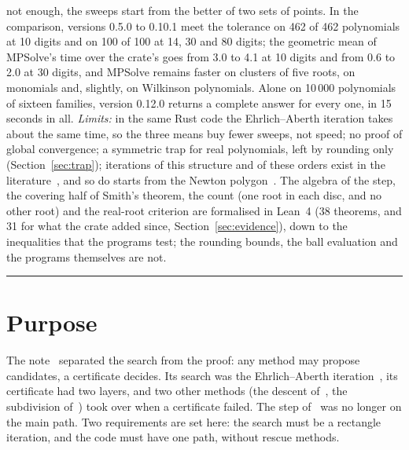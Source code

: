 \documentclass[10pt,a4paper]{article}
\theoremstyle{definition}
\numberwithin{equation}{section}
\begin{document}
not enough, the sweeps start from the better of two sets of points. In the comparison, versions 0.5.0 to
0.10.1 meet the tolerance on 462 of 462 polynomials at 10 digits and on 100 of 100 at 14, 30 and 80
digits; the geometric mean of MPSolve's time over the crate's goes from 3.0 to 4.1 at 10 digits and from
0.6 to 2.0 at 30 digits, and MPSolve remains faster on clusters of five roots, on monomials and, slightly,
on Wilkinson polynomials. Alone on 10\,000 polynomials of sixteen families, version 0.12.0 returns a
complete answer for every one, in 15 seconds in all.
\emph{Limits:} in the same Rust code the Ehrlich--Aberth iteration takes about the same time, so
the three means buy fewer sweeps, not speed; no proof of global convergence; a symmetric trap for real
polynomials, left by rounding only (Section~\ref{sec:trap}); iterations of this structure and of
these orders exist in the literature~\cite{hpr,ppz,prp}, and so do starts from the Newton
polygon~\cite{bini}. The algebra of the step, the covering half of Smith's theorem, the count
(one root in each disc, and no other root) and the real-root criterion are formalised in Lean~4
(38 theorems, and 31 for what the crate added since, Section~\ref{sec:evidence}), down to the
inequalities that the programs test; the rounding bounds, the ball evaluation and the programs themselves
are not.

\vspace{4pt}\hrule

\section{Purpose}
The note~\cite{g7} separated the search from the proof: any method may propose candidates, a
certificate decides. Its search was the Ehrlich--Aberth iteration~\cite{ehrlich,aberth}, its
certificate had two layers, and two other methods (the descent of~\cite{g3}, the subdivision
of~\cite{g6}) took over when a certificate failed. The step of~\cite{v29,g2} was no longer on the
main path. Two requirements are set here: the search must be a rectangle iteration, and the code must
have one path, without rescue methods.
\end{document}
